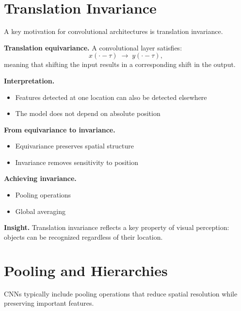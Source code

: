 \section{Translation Invariance}

A key motivation for convolutional architectures is translation invariance.

\medskip

\noindent
\textbf{Translation equivariance.}  
A convolutional layer satisfies:
\[
x(\cdot - \tau) \;\rightarrow\; y(\cdot - \tau),
\]
meaning that shifting the input results in a corresponding shift in the output.

\medskip

\noindent
\textbf{Interpretation.}
\begin{itemize}
    \item Features detected at one location can also be detected elsewhere
    \item The model does not depend on absolute position
\end{itemize}

\medskip

\noindent
\textbf{From equivariance to invariance.}
\begin{itemize}
    \item Equivariance preserves spatial structure
    \item Invariance removes sensitivity to position
\end{itemize}

\medskip

\noindent
\textbf{Achieving invariance.}
\begin{itemize}
    \item Pooling operations
    \item Global averaging
\end{itemize}

\medskip

\noindent
\textbf{Insight.}  
Translation invariance reflects a key property of visual perception: objects can be recognized regardless of their location.

\section{Pooling and Hierarchies}

CNNs typically include pooling operations that reduce spatial resolution while preserving important features.

\medskip

